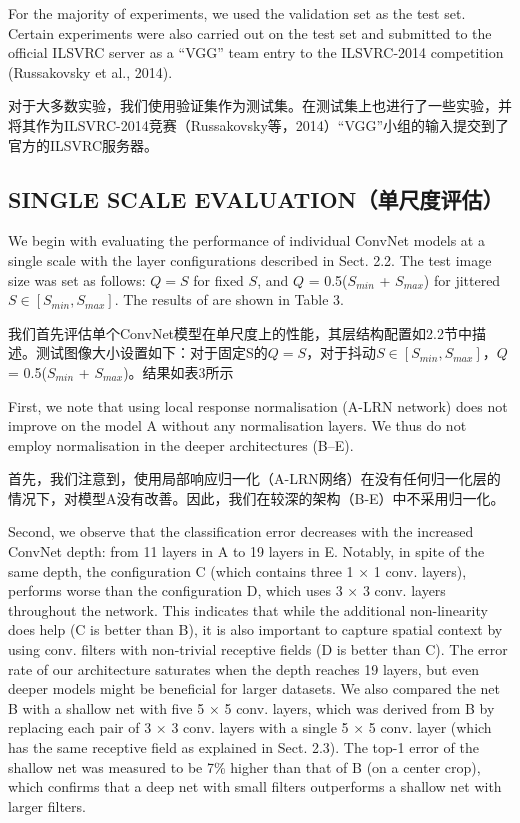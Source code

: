 \documentclass[12pt,a4paper,UTF8,twoside]{book}
\begin{document}
For the majority of experiments, we used the validation set as the test set. Certain experiments were also carried out on the test set and submitted to the official ILSVRC server as a ``VGG'' team entry to the ILSVRC-2014 competition (Russakovsky et al., 2014).

对于大多数实验，我们使用验证集作为测试集。在测试集上也进行了一些实验，并将其作为ILSVRC-2014竞赛（Russakovsky等，2014）``VGG''小组的输入提交到了官方的ILSVRC服务器。

\hypertarget{single-scale-evaluationux5355ux5c3aux5ea6ux8bc4ux4f30}{%
\subsection{SINGLE SCALE EVALUATION（单尺度评估）}\label{single-scale-evaluationux5355ux5c3aux5ea6ux8bc4ux4f30}}

We begin with evaluating the performance of individual ConvNet models at a single scale with the layer configurations described in Sect. 2.2. The test image size was set as follows: \(Q = S\) for fixed \(S\), and \(Q\) = 0.5(\(S_{min}\) + \(S_{max}\)) for jittered \(S \in [S_{min}, S_{max}]\). The results of are shown in Table 3.

我们首先评估单个ConvNet模型在单尺度上的性能，其层结构配置如2.2节中描述。测试图像大小设置如下：对于固定S的\(Q = S\)，对于抖动\(S \in [S_{min}, S_{max}]\)，\(Q\) = 0.5(\(S_{min}\) + \(S_{max}\))。结果如表3所示

First, we note that using local response normalisation (A-LRN network) does not improve on the model A without any normalisation layers. We thus do not employ normalisation in the deeper architectures (B--E).

首先，我们注意到，使用局部响应归一化（A-LRN网络）在没有任何归一化层的情况下，对模型A没有改善。因此，我们在较深的架构（B-E）中不采用归一化。

Second, we observe that the classification error decreases with the increased ConvNet depth: from 11 layers in A to 19 layers in E. Notably, in spite of the same depth, the configuration C (which contains three 1 × 1 conv. layers), performs worse than the configuration D, which uses 3 × 3 conv. layers throughout the network. This indicates that while the additional non-linearity does help (C is better than B), it is also important to capture spatial context by using conv. filters with non-trivial receptive fields (D is better than C). The error rate of our architecture saturates when the depth reaches 19 layers, but even deeper models might be beneficial for larger datasets. We also compared the net B with a shallow net with five 5 × 5 conv. layers, which was derived from B by replacing each pair of 3 × 3 conv. layers with a single 5 × 5 conv. layer (which has the same receptive field as explained in Sect. 2.3). The top-1 error of the shallow net was measured to be 7\% higher than that of B (on a center crop), which confirms that a deep net with small filters outperforms a shallow net with larger filters.
\end{document}
